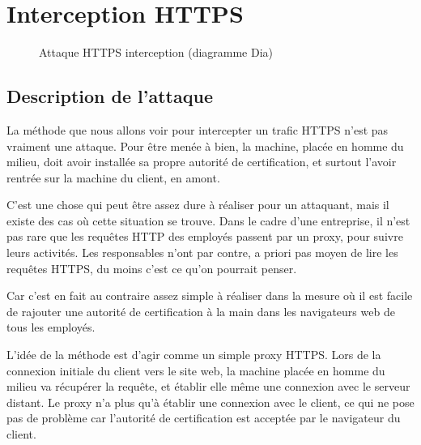 \chapter{Interception HTTPS}

\label{sec:https-interception}

\begin{figure}[H]
  \caption{Attaque HTTPS interception (diagramme Dia)}
\end{figure}

\section{Description de l'attaque}

La méthode que nous allons voir pour intercepter un trafic HTTPS n'est pas vraiment une attaque. Pour être menée à bien, la machine, placée en homme du milieu, doit avoir installée sa propre autorité de certification, et surtout l'avoir rentrée sur la machine du client, en amont.

C'est une chose qui peut être assez dure à réaliser pour un attaquant, mais il existe des cas où cette situation se trouve. Dans le cadre d'une entreprise, il n'est pas rare que les requêtes HTTP des employés passent par un proxy, pour suivre leurs activités. Les responsables n'ont par contre, a priori pas moyen de lire les requêtes HTTPS, du moins c'est ce qu'on pourrait penser.

Car c'est en fait au contraire assez simple à réaliser dans la mesure où il est facile de rajouter une autorité de certification à la main dans les navigateurs web de tous les employés.

L'idée de la méthode est d'agir comme un simple proxy HTTPS. Lors de la connexion initiale du client vers le site web, la machine placée en homme du milieu va récupérer la requête, et établir elle même une connexion avec le serveur distant. Le proxy n'a plus qu'à établir une connexion avec le client, ce qui ne pose pas de problème car l'autorité de certification est acceptée par le navigateur du client.

